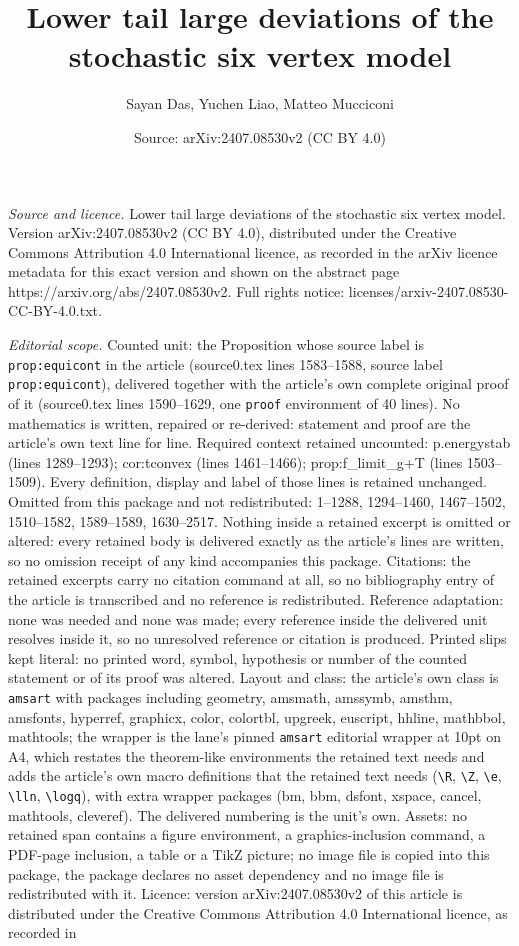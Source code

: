 \documentclass[10pt,a4paper]{amsart}
\title[Lower tail large deviations of the stochastic six vertex mod]{Lower tail large deviations of the stochastic six vertex model}
\author{Sayan Das, Yuchen Liao, Matteo Mucciconi}
\date{Source: arXiv:2407.08530v2 (CC BY 4.0)}
\begin{document}
\maketitle

\noindent\emph{Source and licence.} Lower tail large deviations of the stochastic six vertex model. Version arXiv:2407.08530v2 (CC BY 4.0), distributed under the Creative Commons Attribution 4.0 International licence, as recorded in the arXiv licence metadata for this exact version and shown on the abstract page https://arxiv.org/abs/2407.08530v2. Full rights notice: licenses/arxiv-2407.08530-CC-BY-4.0.txt.\par\smallskip

\noindent\textit{Editorial scope.} Counted unit: the Proposition whose source label is \texttt{prop:equicont} in the article (source0.tex lines 1583--1588, source label \texttt{prop:equicont}), delivered together with the article's own complete original proof of it (source0.tex lines 1590--1629, one \texttt{proof} environment of 40 lines). No mathematics is written, repaired or re-derived: statement and proof are the article's own text line for line. Required context retained uncounted: p.energystab (lines 1289--1293); cor:tconvex (lines 1461--1466); prop:f\_limit\_g+T (lines 1503--1509). Every definition, display and label of those lines is retained unchanged. Omitted from this package and not redistributed: 1--1288, 1294--1460, 1467--1502, 1510--1582, 1589--1589, 1630--2517. Nothing inside a retained excerpt is omitted or altered: every retained body is delivered exactly as the article's lines are written, so no omission receipt of any kind accompanies this package. Citations: the retained excerpts carry no citation command at all, so no bibliography entry of the article is transcribed and no reference is redistributed. Reference adaptation: none was needed and none was made; every reference inside the delivered unit resolves inside it, so no unresolved reference or citation is produced. Printed slips kept literal: no printed word, symbol, hypothesis or number of the counted statement or of its proof was altered. Layout and class: the article's own class is \texttt{amsart} with packages including geometry, amsmath, amssymb, amsthm, amsfonts, hyperref, graphicx, color, colortbl, upgreek, euscript, hhline, mathbbol, mathtools; the wrapper is the lane's pinned \texttt{amsart} editorial wrapper at 10pt on A4, which restates the theorem-like environments the retained text needs and adds the article's own macro definitions that the retained text needs (\texttt{\textbackslash R}, \texttt{\textbackslash Z}, \texttt{\textbackslash e}, \texttt{\textbackslash lln}, \texttt{\textbackslash logq}), with extra wrapper packages (bm, bbm, dsfont, xspace, cancel, mathtools, cleveref). The delivered numbering is the unit's own. Assets: no retained span contains a figure environment, a graphics-inclusion command, a PDF-page inclusion, a table or a TikZ picture; no image file is copied into this package, the package declares no asset dependency and no image file is redistributed with it. Licence: version arXiv:2407.08530v2 of this article is distributed under the Creative Commons Attribution 4.0 International licence, as recorded in 
\end{document}
